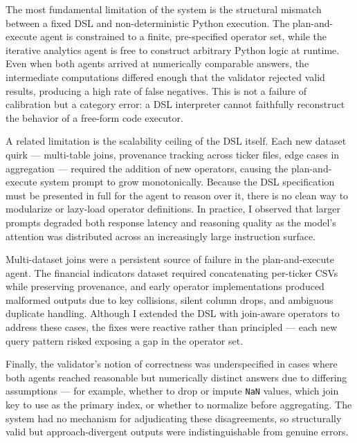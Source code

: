 The most fundamental limitation of the system is the structural mismatch between a fixed DSL and non-deterministic Python execution.
The plan-and-execute agent is constrained to a finite, pre-specified operator set, while the iterative analytics agent is free to construct arbitrary Python logic at runtime.
Even when both agents arrived at numerically comparable answers, the intermediate computations differed enough that the validator rejected valid results, producing a high rate of false negatives.
This is not a failure of calibration but a category error: a DSL interpreter cannot faithfully reconstruct the behavior of a free-form code executor.

A related limitation is the scalability ceiling of the DSL itself.
Each new dataset quirk --- multi-table joins, provenance tracking across ticker files, edge cases in aggregation --- required the addition of new operators, causing the plan-and-execute system prompt to grow monotonically.
Because the DSL specification must be presented in full for the agent to reason over it, there is no clean way to modularize or lazy-load operator definitions.
In practice, I observed that larger prompts degraded both response latency and reasoning quality as the model's attention was distributed across an increasingly large instruction surface.

Multi-dataset joins were a persistent source of failure in the plan-and-execute agent.
The financial indicators dataset required concatenating per-ticker CSVs while preserving provenance, and early operator implementations produced malformed outputs due to key collisions, silent column drops, and ambiguous duplicate handling.
Although I extended the DSL with join-aware operators to address these cases, the fixes were reactive rather than principled --- each new query pattern risked exposing a gap in the operator set.

Finally, the validator's notion of correctness was underspecified in cases where both agents reached reasonable but numerically distinct answers due to differing assumptions --- for example, whether to drop or impute \texttt{NaN} values, which join key to use as the primary index, or whether to normalize before aggregating.
The system had no mechanism for adjudicating these disagreements, so structurally valid but approach-divergent outputs were indistinguishable from genuine errors.
